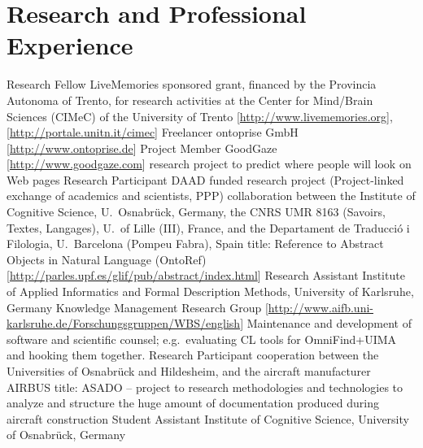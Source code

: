 \documentclass[11pt,a4paper]{moderncv}
\begin{document}
\pagebreak

\section{Research and Professional Experience}
        {Research Fellow}
        {LiveMemories sponsored grant, financed by the Provincia Autonoma of Trento, for research activities at the Center for Mind/Brain Sciences (CIMeC) of the University of Trento [\url{http://www.livememories.org}],[\url{http://portale.unitn.it/cimec}]}
        {}{}{}
        {Freelancer}
        {ontoprise GmbH [\url{http://www.ontoprise.de}]}
        {}{}{}
        {Project Member}
        {GoodGaze [\url{http://www.goodgaze.com}]}
        {\small research project to predict where people will look on Web pages}
        {}{}
        {Research Participant}
        {DAAD funded research project (Project-linked exchange of academics and scientists, PPP)}
        {\small collaboration between the Institute of Cognitive Science, U.~Osnabr\"{u}ck, Germany, the CNRS UMR 8163 (Savoirs, Textes, Langages), U.~of Lille (III), France, and the Departament de Traducci\'{o} i Filologia, U.~Barcelona (Pompeu Fabra), Spain}
        {\small title: Reference to Abstract Objects in Natural Language (OntoRef) [\url{http://parles.upf.es/glif/pub/abstract/index.html}]}
        {}
        {Research Assistant}
        {Institute of Applied Informatics and Formal Description Methods, University of Karlsruhe, Germany}
        {\small Knowledge Management Research Group}
        {[\url{http://www.aifb.uni-karlsruhe.de/Forschungsgruppen/WBS/english}]}
        {Maintenance and development of software and scientific counsel; e.g.~evaluating CL tools for OmniFind+UIMA and hooking them together.}
        {Research Participant}
        {cooperation between the Universities of Osnabr\"{u}ck and Hildesheim, and the aircraft manufacturer AIRBUS}
        {\small title: ASADO -- project to research methodologies and technologies to analyze and structure the huge amount of documentation produced during aircraft construction}
        {}{}
        {Student Assistant}
        {Institute of Cognitive Science, University of Osnabr\"{u}ck, Germany}
\end{document}
